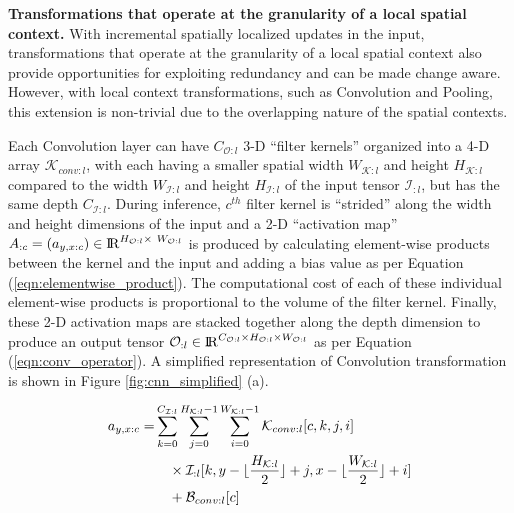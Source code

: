 \vspace{2mm}
\noindent \textbf{Transformations that operate at the granularity of a local spatial context.}
With incremental spatially localized updates in the input, transformations that operate at the granularity of a local spatial context also provide opportunities for exploiting redundancy and can be made change aware.
However, with local context transformations, such as Convolution and Pooling, this extension is non-trivial due to the overlapping nature of the spatial contexts.

Each Convolution layer can have $C_{\mathcal{O}:l}$ 3-D ``filter kernels'' organized into a 4-D array $\mathcal{K}_{conv:l}$, with each having a smaller spatial width $W_{\mathcal{K}:l}$ and height $H_{\mathcal{K}:l}$ compared to the width $W_{\mathcal{I}:l}$ and height $H_{\mathcal{I}:l}$ of the input tensor $\mathcal{I}_{:l}$, but has the same depth $C_{\mathcal{I}:l}$.
During inference, $c^{th}$ filter kernel is ``strided'' along the width and height dimensions of the input and a 2-D ``activation map'' $A_{:c}=(a_{y,x:c})\in \mathcal{\rm I\!R}^{H_{\mathcal{O}:l} \times~ W_{\mathcal{O}:l}}$ is produced by calculating element-wise products between the kernel and the input and adding a bias value as per Equation (\ref{eqn:elementwise_product}).
The computational cost of each of these individual element-wise products is proportional to the volume of the filter kernel.
Finally, these 2-D activation maps are stacked together along the depth dimension to produce an output tensor $\mathcal{O}_{:l} \in \mathcal{\rm I\!R}^{C_{\mathcal{O}:l} \times H_{\mathcal{O}:l} \times W_{\mathcal{O}:l}}$ as per Equation (\ref{eqn:conv_operator}).
A simplified representation of Convolution transformation is shown in Figure \ref{fig:cnn_simplified} (a).


\begin{align}
\label{eqn:elementwise_product}
\begin{split}
a_{y,x:c} =& \sum_{k=0}^{C_{\mathcal{I}:l} } \sum_{j=0}^{H_{\mathcal{K}:l}-1} \sum_{i=0}^{W_{\mathcal{K}:l}-1} \mathcal{K}_{conv:l}[c, k, j, i] \\
& \quad \times \mathcal{I}_{:l}[k,y-\lfloor\frac{H_{\mathcal{K}:l} }{2}\rfloor+j,x-\lfloor\frac{W_{\mathcal{K}:l} }{2}\rfloor+i] \\
& \quad + \mathcal{B}_{conv:l}[c]
\end{split}
\end{align}

